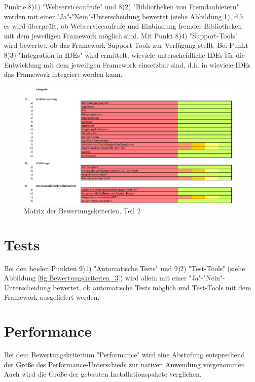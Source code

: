 Punkte 8)1) "Webserviceaufrufe" und 8)2) "Bibliotheken von Fremdanbietern" werden mit einer "Ja"-"Nein"-Unterscheidung bewertet (siehe Abbildung \ref{fig:Bewertungskriterien_2}), d.h. es wird überprüft, ob Webserviceaufrufe und Einbindung fremder Bibliotheken mit dem jeweiligen Framework möglich sind. Mit Punkt 8)4) "Support-Tools" wird bewertet, ob das Framework Support-Tools zur Verfügung stellt. Bei Punkt 8)3) "Integration in IDEs" wird ermittelt, wieviele unterscheidliche IDEs für die Entwicklung mit dem jeweiligen Framework einsetzbar sind, d.h. in wieviele IDEs das Framework integriert werden kann. 

\begin{figure}[h]
	\centering
	\includegraphics[width=1\textwidth]{Bilder/Bewertungsmatrix_2.PNG}
	\caption{Matrix der Bewertungskriterien, Teil 2}
	\label{fig:Bewertungskriterien_2}
\end{figure}
\clearpage
\section{Tests}

Bei den beiden Punkten 9)1) "Automatische Tests" und 9)2) "Test-Tools" (siehe Abbildung \ref{fig:Bewertungskriterien_3}) wird allein mit einer "Ja"-"Nein"-Unterscheidung bewertet, ob automatische Tests möglich und Test-Tools mit dem Framework ausgeliefert werden. 

\section{Performance}

Bei dem Bewertungskriterium "Performance" wird eine Abstufung entsprechend der Größe des Performance-Unterschieds zur nativen Anwendung vorgenommen. Auch wird die Größe der gebauten Installationspakete verglichen. 

